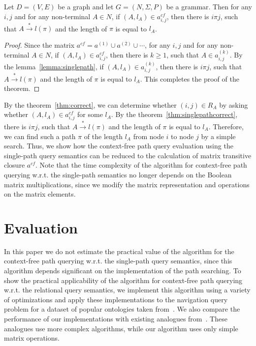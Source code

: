 \documentclass[runningheads,a4paper]{llncs}
\begin{document}
\begin{mytheorem}\label{thm:singlepathcorrect}
	Let $D = (V,E)$ be a graph and let $G =(N,\Sigma,P)$ be a grammar. Then for any $i, j$ and for any non-terminal $A \in N$, if $(A, l_A) \in a^{cf}_{i,j}$, then there is $i \pi j$, such that $A \xrightarrow{*} l(\pi)$ and the length of $\pi$ is equal to $l_A$.
\end{mytheorem}
\begin{proof}
	
	Since the matrix $a^{cf} = a^{(1)} \cup a^{(2)} \cup \cdots$, for any $i, j$ and for any non-terminal $A \in N$, if $(A, l_A) \in a^{cf}_{i,j}$, then there is $k \geq 1$, such that $A \in a^{(k)}_{i,j}$. By the lemma~\ref{lemma:singlepath}, if $(A, l_A) \in a^{(k)}_{i,j}$, then there is $i \pi j$, such that $A \xrightarrow{*} l(\pi)$ and the length of $\pi$ is equal to $l_A$. This completes the proof of the theorem.
\end{proof}

By the theorem~\ref{thm:correct}, we can determine whether $(i,j) \in R_A$ by asking whether $(A, l_A) \in a^{cf}_{i,j}$ for some $l_A$. By the theorem~\ref{thm:singlepathcorrect}, there is $i \pi j$, such that $A \xrightarrow{*} l(\pi)$ and the length of $\pi$ is equal to $l_A$. Therefore, we can find such a path $\pi$ of the length $l_A$ from node $i$ to node $j$ by a simple search. Thus, we show how the context-free path query evaluation using the single-path query semantics can be reduced to the calculation of matrix transitive closure $a^{cf}$. Note that the time complexity of the algorithm for context-free path querying w.r.t. the single-path semantics no longer depends on the Boolean matrix multiplications, since we modify the matrix representation and operations on the matrix elements.


\section{Evaluation}%
In this paper we do not estimate the practical value of the algorithm for the context-free path querying w.r.t. the single-path query semantics, since this algorithm depends significant on the implementation of the path searching. To show the practical applicability of the algorithm for context-free path querying w.r.t. the relational query semantics, we implement this algorithm using a variety of optimizations and apply these implementations to the navigation query problem for a dataset of popular ontologies taken from~\cite{RDF}. We also compare the performance of our implementations with existing analogues from~\cite{GLL,RDF}. These analogues use more complex algorithms, while our algorithm uses only simple matrix operations.
\end{document}
